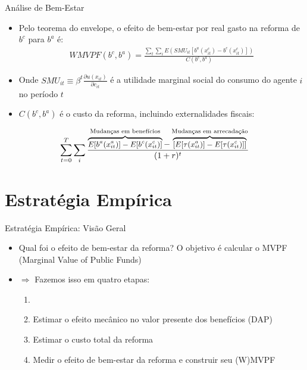 \begin{frame}{Análise de Bem-Estar}
    \begin{itemize}
        \item Pelo teorema do envelope, o efeito de bem-estar por real gasto na reforma de $b^c$ para $b^a$ é:
        \begin{align*}
            WMVPF(b^c,b^a)=\frac{\sum_t \sum_i E(SMU_{it}[b^a(x^c_{it})-b^c(x^c_{it})])}{C(b^c,b^a)}
        \end{align*}
        \item Onde $SMU_{it} \equiv \beta^t \frac{\partial u(x_{it})}{\partial c_{it}}$ é a utilidade marginal social do consumo do agente $i$ no período $t$
        \item $C(b^c,b^a)$ é o custo da reforma, incluindo externalidades fiscais:
    \end{itemize}
    \small
    \begin{align*}
        \small
        \sum_{t=0}^T \sum_i \frac{\overbrace{E[b^a(x_{it}^a)]-E[b^c(x_{it}^c)]}^{\text{Mudanças em benefícios}}-
        \overbrace{\left[E[\tau(x_{it}^a)]-E[\tau(x_{it}^c)]\right]}^{\text{Mudanças em arrecadação}}}{(1+r)^t}
    \end{align*}
\end{frame}

\section{Estratégia Empírica}

\begin{frame}{Estratégia Empírica: Visão Geral}
\begin{itemize}
    \item Qual foi o efeito de bem-estar da reforma? O objetivo é calcular o MVPF (Marginal Value of Public Funds)
    \item[] $\Rightarrow$  Fazemos isso em quatro etapas:
    \begin{enumerate}
        \item {}
        \item Estimar o efeito mecânico no valor presente dos benefícios (DAP)
        \item Estimar o custo total da reforma
        \item Medir o efeito de bem-estar da reforma e construir seu (W)MVPF
    \end{enumerate}
\end{itemize}
\end{frame}

